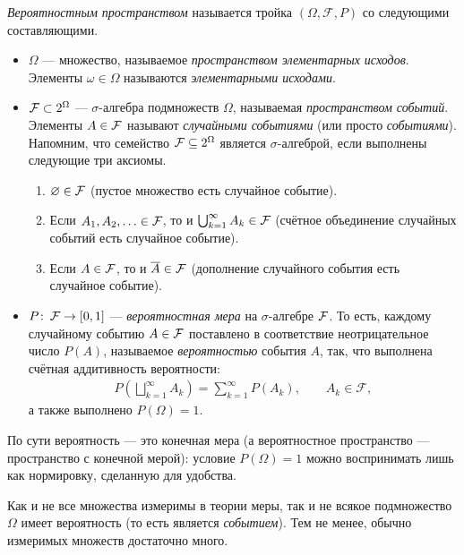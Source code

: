 \documentclass[../main.tex]{subfiles}
\begin{document}
\begin{df}
 \textit{Вероятностным пространством} называется тройка $(\Omega, \mathcal F, P)$ со следующими составляющими.
 \begin{itemize}
  \item $\Omega$ --- множество, называемое \textit{пространством элементарных исходов}. Элементы $ \omega \in \Omega $ называются \textit{элементарными исходами}.
  \item $\mathcal F \subset 2^{\Omega}$ --- $\sigma$-алгебра подмножеств $\Omega$, называемая \textit{пространством событий}. Элементы $A \in \mathcal F$ называют \textit{случайными событиями} (или просто \textit{событиями}). Напомним, что семейство $ \mathcal F \subseteq 2^{\Omega} $ является $ \sigma $-алгеброй, если выполнены следующие три аксиомы.
   \begin{enumerate}
    \item $ \varnothing \in \mathcal F $ (пустое множество есть случайное событие).
    \item Если $ A_1, A_2, \ldots \in \mathcal F $, то и $\bigcup_{k=1}^{\infty}A_k \in \mathcal F$ (счётное объединение случайных событий есть случайное событие).
    \item Если $ A \in \mathcal F $, то и $ \overline A \in \mathcal F $ (дополнение случайного события есть случайное событие).
   \end{enumerate}
  \item $P \colon\, \mathcal F \to [0,1]$ --- \textit{вероятностная мера} на $ \sigma $-алгебре $\mathcal F$. То есть, каждому случайному событию $ A \in \mathcal F $ поставлено в соответствие неотрицательное число $ P(A) $, называемое \textit{вероятностью} события $ A $, так, что выполнена счётная аддитивность вероятности:
   \begin{align*}
    P \left( \bigsqcup_{k=1}^{\infty}A_k \right) = \sum_{k=1}^{\infty}P(A_k), \qquad A_k \in \mathcal F,
   \end{align*} а также выполнено $P(\Omega) = 1$.
 \end{itemize}
\end{df}

По сути вероятность --- это конечная мера (а вероятностное пространство --- пространство с конечной мерой): условие $ P(\Omega) = 1 $ можно воспринимать лишь как нормировку, сделанную для удобства.

Как и не все множества измеримы в теории меры, так и не всякое подмножество $ \Omega $ имеет вероятность (то есть является \textit{событием}). Тем не менее, обычно измеримых множеств достаточно много.
\end{document}
